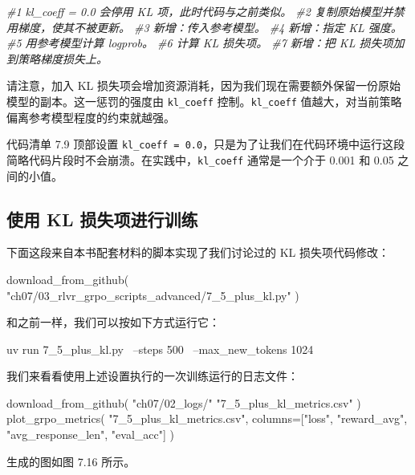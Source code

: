 {\noindent\small\textit{\#1 kl\_coeff = 0.0 会停用 KL 项，此时代码与之前类似。 \newline \#2 复制原始模型并禁用梯度，使其不被更新。 \newline \#3 新增：传入参考模型。 \newline \#4 新增：指定 KL 强度。 \newline \#5 用参考模型计算 logprob。 \newline \#6 计算 KL 损失项。 \newline \#7 新增：把 KL 损失项加到策略梯度损失上。}\par}

请注意，加入 KL 损失项会增加资源消耗，因为我们现在需要额外保留一份原始模型的副本。这一惩罚的强度由 \texttt{kl\_coeff} 控制。\texttt{kl\_coeff} 值越大，对当前策略偏离参考模型程度的约束就越强。

代码清单 7.9 顶部设置 \texttt{kl\_coeff = 0.0}，只是为了让我们在代码环境中运行这段简略代码片段时不会崩溃。在实践中，\texttt{kl\_coeff} 通常是一个介于 0.001 和 0.05 之间的小值。

\subsection{使用 KL 损失项进行训练}

下面这段来自本书配套材料的脚本实现了我们讨论过的 KL 损失项代码修改：

\begin{codebox}
download_from_github(
    "ch07/03_rlvr_grpo_scripts_advanced/7_5_plus_kl.py"
)
\end{codebox}

和之前一样，我们可以按如下方式运行它：

\begin{codebox}
uv run 7_5_plus_kl.py \
    --steps 500  \
    --max_new_tokens 1024
\end{codebox}

我们来看看使用上述设置执行的一次训练运行的日志文件：

\begin{codebox}
download_from_github(
    "ch07/02_logs/"
    "7_5_plus_kl_metrics.csv"
)
plot_grpo_metrics(
    "7_5_plus_kl_metrics.csv",
    columns=["loss", "reward_avg", "avg_response_len", "eval_acc"]
)
\end{codebox}

生成的图如图 7.16 所示。


